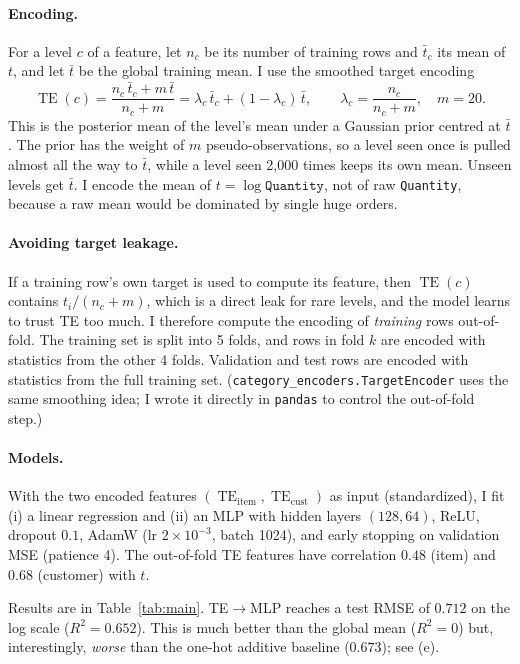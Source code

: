 \documentclass[11pt]{article}
\newcommand{\TE}{\operatorname{TE}}
\begin{document}
\paragraph{Encoding.} For a level $c$ of a feature, let $n_c$ be its number of training rows and
$\bar t_c$ its mean of $t$, and let $\bar t$ be the global training mean. I use the smoothed
target encoding
\begin{equation}\label{eq:te}
 \TE(c)=\frac{n_c\,\bar t_c + m\,\bar t}{n_c+m}
        =\lambda_c\,\bar t_c+(1-\lambda_c)\,\bar t,\qquad \lambda_c=\frac{n_c}{n_c+m},\quad m=20 .
\end{equation}
This is the posterior mean of the level's mean under a Gaussian prior centred at $\bar t$. The
prior has the weight of $m$ pseudo-observations, so a level seen once is pulled almost all the way
to $\bar t$, while a level seen 2{,}000 times keeps its own mean. Unseen levels get $\bar t$. I
encode the mean of $t=\log\texttt{Quantity}$, not of raw \texttt{Quantity}, because a raw mean
would be dominated by single huge orders.

\paragraph{Avoiding target leakage.} If a training row's own target is used to compute its
feature, then $\TE(c)$ contains $t_i/(n_c+m)$, which is a direct leak for rare levels, and the
model learns to trust TE too much. I therefore compute the encoding of \emph{training} rows
out-of-fold. The training set is split into 5 folds, and rows in fold $k$ are encoded with
statistics from the other 4 folds. Validation and test rows are encoded with statistics from the
full training set. (\texttt{category\_encoders.TargetEncoder} uses the same smoothing idea; I wrote
it directly in \texttt{pandas} to control the out-of-fold step.)

\paragraph{Models.} With the two encoded features $(\TE_{\text{item}},\TE_{\text{cust}})$ as input
(standardized), I fit (i) a linear regression and (ii) an MLP with hidden layers $(128,64)$,
ReLU, dropout $0.1$, AdamW (lr $2\times10^{-3}$, batch 1024), and early stopping on validation
MSE (patience 4). The out-of-fold TE features have correlation $0.48$ (item) and $0.68$
(customer) with $t$.

Results are in Table~\ref{tab:main}. TE$\to$MLP reaches a test RMSE of $0.712$ on the log scale
($R^2=0.652$). This is much better than the global mean ($R^2=0$) but, interestingly,
\emph{worse} than the one-hot additive baseline ($0.673$); see (e).
\end{document}
